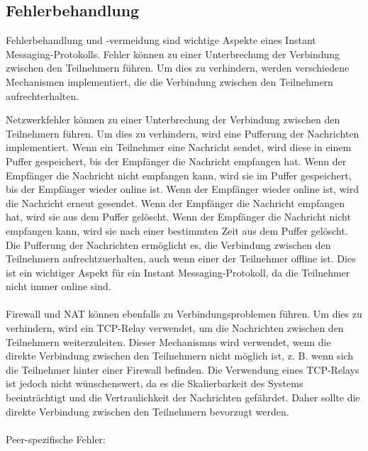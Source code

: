 \subsection{Fehlerbehandlung}

Fehlerbehandlung und -vermeidung sind wichtige Aspekte eines Instant Messaging-Protokolls. Fehler können zu einer Unterbrechung der Verbindung zwischen den Teilnehmern führen. Um dies zu verhindern, werden verschiedene Mechanismen implementiert, die die Verbindung zwischen den Teilnehmern aufrechterhalten.

Netzwerkfehler können zu einer Unterbrechung der Verbindung zwischen den Teilnehmern führen. Um dies zu verhindern, wird eine Pufferung der Nachrichten implementiert. Wenn ein Teilnehmer eine Nachricht sendet, wird diese in einem Puffer gespeichert, bis der Empfänger die Nachricht empfangen hat. Wenn der Empfänger die Nachricht nicht empfangen kann, wird sie im Puffer gespeichert, bis der Empfänger wieder online ist. Wenn der Empfänger wieder online ist, wird die Nachricht erneut gesendet. Wenn der Empfänger die Nachricht empfangen hat, wird sie aus dem Puffer gelöscht. Wenn der Empfänger die Nachricht nicht empfangen kann, wird sie nach einer bestimmten Zeit aus dem Puffer gelöscht. Die Pufferung der Nachrichten ermöglicht es, die Verbindung zwischen den Teilnehmern aufrechtzuerhalten, auch wenn einer der Teilnehmer offline ist. Dies ist ein wichtiger Aspekt für ein Instant Messaging-Protokoll, da die Teilnehmer nicht immer online sind. 
\\
\\
Firewall und NAT können ebenfalls zu Verbindungsproblemen führen. Um dies zu verhindern, wird ein TCP-Relay verwendet, um die Nachrichten zwischen den Teilnehmern weiterzuleiten. Dieser Mechanismus wird verwendet, wenn die direkte Verbindung zwischen den Teilnehmern nicht möglich ist, z. B. wenn sich die Teilnehmer hinter einer Firewall befinden. Die Verwendung eines TCP-Relays ist jedoch nicht wünschenswert, da es die Skalierbarkeit des Systems beeinträchtigt und die Vertraulichkeit der Nachrichten gefährdet. Daher sollte die direkte Verbindung zwischen den Teilnehmern bevorzugt werden.
\\
\\
Peer-spezifische Fehler:
\\
\\

